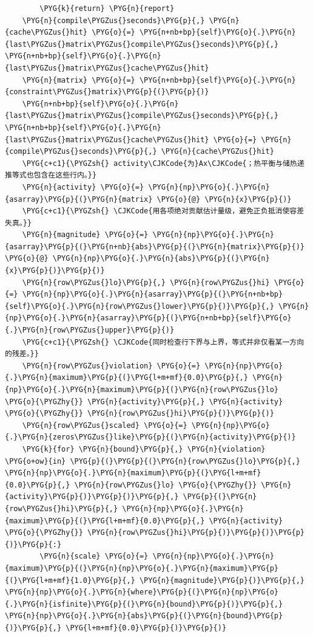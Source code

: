 \begin{Verbatim}
        \PYG{k}{return} \PYG{n}{report}
    \PYG{n}{compile\PYGZus{}seconds}\PYG{p}{,} \PYG{n}{cache\PYGZus{}hit} \PYG{o}{=} \PYG{n+nb+bp}{self}\PYG{o}{.}\PYG{n}{last\PYGZus{}matrix\PYGZus{}compile\PYGZus{}seconds}\PYG{p}{,} \PYG{n+nb+bp}{self}\PYG{o}{.}\PYG{n}{last\PYGZus{}matrix\PYGZus{}cache\PYGZus{}hit}
    \PYG{n}{matrix} \PYG{o}{=} \PYG{n+nb+bp}{self}\PYG{o}{.}\PYG{n}{constraint\PYGZus{}matrix}\PYG{p}{(}\PYG{p}{)}
    \PYG{n+nb+bp}{self}\PYG{o}{.}\PYG{n}{last\PYGZus{}matrix\PYGZus{}compile\PYGZus{}seconds}\PYG{p}{,} \PYG{n+nb+bp}{self}\PYG{o}{.}\PYG{n}{last\PYGZus{}matrix\PYGZus{}cache\PYGZus{}hit} \PYG{o}{=} \PYG{n}{compile\PYGZus{}seconds}\PYG{p}{,} \PYG{n}{cache\PYGZus{}hit}
    \PYG{c+c1}{\PYGZsh{} activity\CJKCode{为}Ax\CJKCode{；热平衡与储热递推等式也包含在这些行内。}}
    \PYG{n}{activity} \PYG{o}{=} \PYG{n}{np}\PYG{o}{.}\PYG{n}{asarray}\PYG{p}{(}\PYG{n}{matrix} \PYG{o}{@} \PYG{n}{x}\PYG{p}{)}
    \PYG{c+c1}{\PYGZsh{} \CJKCode{用各项绝对贡献估计量级，避免正负抵消使容差失真。}}
    \PYG{n}{magnitude} \PYG{o}{=} \PYG{n}{np}\PYG{o}{.}\PYG{n}{asarray}\PYG{p}{(}\PYG{n+nb}{abs}\PYG{p}{(}\PYG{n}{matrix}\PYG{p}{)} \PYG{o}{@} \PYG{n}{np}\PYG{o}{.}\PYG{n}{abs}\PYG{p}{(}\PYG{n}{x}\PYG{p}{)}\PYG{p}{)}
    \PYG{n}{row\PYGZus{}lo}\PYG{p}{,} \PYG{n}{row\PYGZus{}hi} \PYG{o}{=} \PYG{n}{np}\PYG{o}{.}\PYG{n}{asarray}\PYG{p}{(}\PYG{n+nb+bp}{self}\PYG{o}{.}\PYG{n}{row\PYGZus{}lower}\PYG{p}{)}\PYG{p}{,} \PYG{n}{np}\PYG{o}{.}\PYG{n}{asarray}\PYG{p}{(}\PYG{n+nb+bp}{self}\PYG{o}{.}\PYG{n}{row\PYGZus{}upper}\PYG{p}{)}
    \PYG{c+c1}{\PYGZsh{} \CJKCode{同时检查行下界与上界，等式并非仅看某一方向的残差。}}
    \PYG{n}{row\PYGZus{}violation} \PYG{o}{=} \PYG{n}{np}\PYG{o}{.}\PYG{n}{maximum}\PYG{p}{(}\PYG{l+m+mf}{0.0}\PYG{p}{,} \PYG{n}{np}\PYG{o}{.}\PYG{n}{maximum}\PYG{p}{(}\PYG{n}{row\PYGZus{}lo} \PYG{o}{\PYGZhy{}} \PYG{n}{activity}\PYG{p}{,} \PYG{n}{activity} \PYG{o}{\PYGZhy{}} \PYG{n}{row\PYGZus{}hi}\PYG{p}{)}\PYG{p}{)}
    \PYG{n}{row\PYGZus{}scaled} \PYG{o}{=} \PYG{n}{np}\PYG{o}{.}\PYG{n}{zeros\PYGZus{}like}\PYG{p}{(}\PYG{n}{activity}\PYG{p}{)}
    \PYG{k}{for} \PYG{n}{bound}\PYG{p}{,} \PYG{n}{violation} \PYG{o+ow}{in} \PYG{p}{(}\PYG{p}{(}\PYG{n}{row\PYGZus{}lo}\PYG{p}{,} \PYG{n}{np}\PYG{o}{.}\PYG{n}{maximum}\PYG{p}{(}\PYG{l+m+mf}{0.0}\PYG{p}{,} \PYG{n}{row\PYGZus{}lo} \PYG{o}{\PYGZhy{}} \PYG{n}{activity}\PYG{p}{)}\PYG{p}{)}\PYG{p}{,} \PYG{p}{(}\PYG{n}{row\PYGZus{}hi}\PYG{p}{,} \PYG{n}{np}\PYG{o}{.}\PYG{n}{maximum}\PYG{p}{(}\PYG{l+m+mf}{0.0}\PYG{p}{,} \PYG{n}{activity} \PYG{o}{\PYGZhy{}} \PYG{n}{row\PYGZus{}hi}\PYG{p}{)}\PYG{p}{)}\PYG{p}{)}\PYG{p}{:}
        \PYG{n}{scale} \PYG{o}{=} \PYG{n}{np}\PYG{o}{.}\PYG{n}{maximum}\PYG{p}{(}\PYG{n}{np}\PYG{o}{.}\PYG{n}{maximum}\PYG{p}{(}\PYG{l+m+mf}{1.0}\PYG{p}{,} \PYG{n}{magnitude}\PYG{p}{)}\PYG{p}{,} \PYG{n}{np}\PYG{o}{.}\PYG{n}{where}\PYG{p}{(}\PYG{n}{np}\PYG{o}{.}\PYG{n}{isfinite}\PYG{p}{(}\PYG{n}{bound}\PYG{p}{)}\PYG{p}{,} \PYG{n}{np}\PYG{o}{.}\PYG{n}{abs}\PYG{p}{(}\PYG{n}{bound}\PYG{p}{)}\PYG{p}{,} \PYG{l+m+mf}{0.0}\PYG{p}{)}\PYG{p}{)}

\end{Verbatim}
